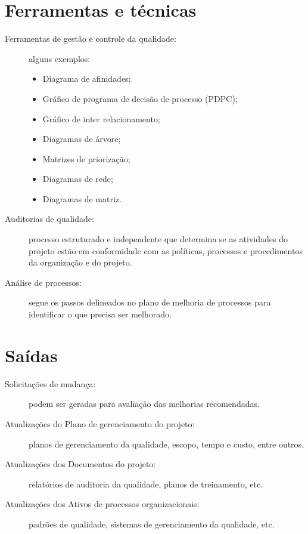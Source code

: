 \section{Ferramentas e técnicas}

\begin{description}
	
	\item[Ferramentas de gestão e controle da qualidade:] alguns exemplos:
	
	\begin{itemize}
		
		\item Diagrama de afinidades;
		
		\item Gráfico de programa de decisão de processo (PDPC);
		
		\item Gráfico de inter relacionamento;
		
		\item Diagramas de árvore;
		
		\item Matrizes de priorização;
		
		\item Diagramas de rede;
		
		\item Diagramas de matriz.
		
	\end{itemize}
	
	\item[Auditorias de qualidade:] processo estruturado e independente que determina se as atividades do projeto estão em conformidade com as políticas, processos e procedimentos da organização e do projeto.
	
	\item[Análise de processos:] segue os passos delineados no plano de melhoria de processos para identificar o que precisa ser melhorado.
		
\end{description}

\section{Saídas}

\begin{description}
	\item[Solicitações de mudança:] podem ser geradas para avaliação das melhorias recomendadas.
	
	\item[Atualizações do Plano de gerenciamento do projeto:] planos de gerenciamento da qualidade, escopo, tempo e custo, entre outros.
	
	\item[Atualizações dos Documentos do projeto:] relatórios de auditoria da qualidade, planos de treinamento, etc.
	
	\item[Atualizações dos Ativos de processos organizacionais:] padrões de qualidade, sistemas de gerenciamento da qualidade, etc.
	
\end{description}

